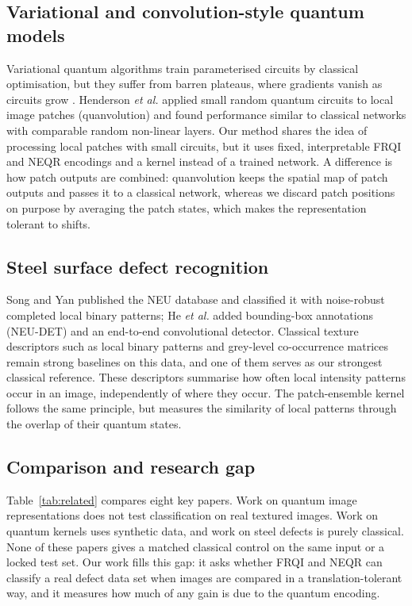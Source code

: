\documentclass[12pt,onecolumn,draftclsnofoot]{IEEEtran}
\begin{document}
\subsection{Variational and convolution-style quantum models}
Variational quantum algorithms \cite{cerezo2021vqa} train parameterised circuits by classical optimisation, but they suffer from barren plateaus, where gradients vanish as circuits grow \cite{mcclean2018barren}. Henderson \emph{et al.} \cite{henderson2020quanv} applied small random quantum circuits to local image patches (quanvolution) and found performance similar to classical networks with comparable random non-linear layers. Our method shares the idea of processing local patches with small circuits, but it uses fixed, interpretable FRQI and NEQR encodings and a kernel instead of a trained network. A difference is how patch outputs are combined: quanvolution keeps the spatial map of patch outputs and passes it to a classical network, whereas we discard patch positions on purpose by averaging the patch states, which makes the representation tolerant to shifts.

\subsection{Steel surface defect recognition}
Song and Yan \cite{song2013neu} published the NEU database and classified it with noise-robust completed local binary patterns; He \emph{et al.} \cite{he2020neudet} added bounding-box annotations (NEU-DET) and an end-to-end convolutional detector. Classical texture descriptors such as local binary patterns \cite{ojala2002lbp} and grey-level co-occurrence matrices \cite{haralick1973glcm} remain strong baselines on this data, and one of them serves as our strongest classical reference. These descriptors summarise how often local intensity patterns occur in an image, independently of where they occur. The patch-ensemble kernel follows the same principle, but measures the similarity of local patterns through the overlap of their quantum states.

\subsection{Comparison and research gap}
Table~\ref{tab:related} compares eight key papers. Work on quantum image representations does not test classification on real textured images. Work on quantum kernels uses synthetic data, and work on steel defects is purely classical. None of these papers gives a matched classical control on the same input or a locked test set. Our work fills this gap: it asks whether FRQI and NEQR can classify a real defect data set when images are compared in a translation-tolerant way, and it measures how much of any gain is due to the quantum encoding.
\end{document}
